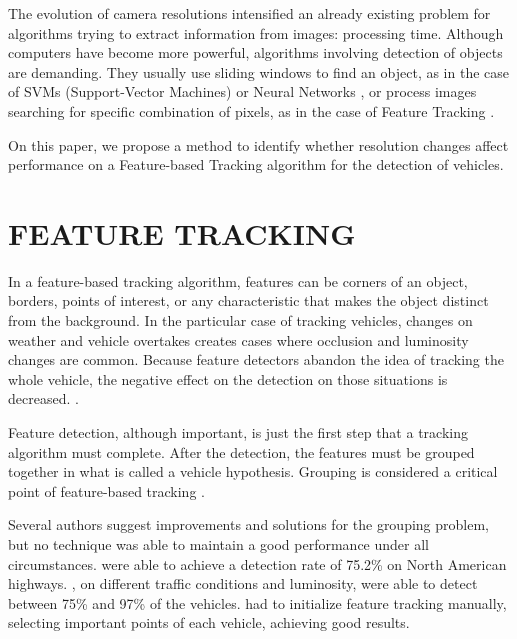 \documentclass[article,12pt,a4paper,oneside,hidelinks]{memoir}
\begin{document}
The evolution of camera resolutions intensified an already existing problem for algorithms trying to extract information from images: processing time. Although computers have become more powerful, algorithms involving detection of objects are demanding. They usually use sliding windows to find an object, as in the case of SVMs (Support-Vector Machines) \citep{cortes1995support} or Neural Networks \citep{rumelhart1985learning}, or process images searching for specific combination of pixels, as in the case of Feature Tracking \citep{shi1993good}.

On this paper, we propose a method to identify whether resolution changes affect performance on a Feature-based Tracking algorithm for the detection of vehicles.

\section{FEATURE TRACKING}
\label{secFeature}
In a feature-based tracking algorithm, features can be corners of an object, borders, points of interest, or any characteristic that makes the object distinct from the background. In the particular case of tracking vehicles, changes on weather and vehicle overtakes creates cases where occlusion and luminosity changes are common. Because feature detectors abandon the idea of tracking the whole vehicle, the negative effect on the detection on those situations is decreased. \citep{saunier2006feature}.

Feature detection, although important, is just the first step that a tracking algorithm must complete. After the detection, the features must be grouped together in what is called a vehicle hypothesis. Grouping is considered a critical point of feature-based tracking \citep{cavallaro2005tracking}.

Several authors suggest improvements and solutions for the grouping problem, but no technique was able to maintain a good performance under all circumstances. \citet{beymer1997real} were able to achieve a detection rate of 75.2\% on North American highways. \citet{coifman1998real}, on different traffic conditions and luminosity, were able to detect between 75\% and 97\% of the vehicles. \citet{collins2005online} had to initialize feature tracking manually, selecting important points of each vehicle, achieving good results. 
\end{document}

